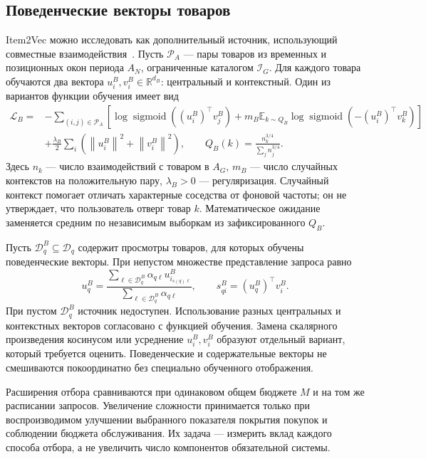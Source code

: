 \documentclass[12pt,a4paper]{article}
\newcommand{\R}{\mathbb R}
\newcommand{\E}{\mathbb E}
\newcommand{\norm}[1]{\left\lVert#1\right\rVert}
\DeclareMathOperator{\sigmoid}{sigmoid}
\theoremstyle{plainru}
\begin{document}
\subsection{Поведенческие векторы товаров}

Item2Vec можно исследовать как дополнительный источник,
использующий совместные взаимодействия~\cite{item2vec}.
Пусть $\mathcal P_A$ --- пары товаров из временных и позиционных
окон периода $A_N$, ограниченные каталогом $\mathcal I_G$. Для каждого товара обучаются
два вектора $u_i^{B},v_i^{B}\in\R^{d_B}$: центральный и контекстный.
Один из вариантов функции обучения имеет вид
\begin{align}\label{eq:model-item2vec}
\mathcal L_B=&-\sum_{(i,j)\in\mathcal P_A}
\left[\log\sigmoid((u_i^{B})^\top v_j^{B})
+m_B\E_{k\sim Q_B}\log\sigmoid(-(u_i^{B})^\top v_k^{B})\right]
\nonumber\\
&+\frac{\lambda_B}{2}\sum_i(\norm{u_i^{B}}^2+\norm{v_i^{B}}^2),
\qquad Q_B(k)=\frac{n_k^{3/4}}{\sum_jn_j^{3/4}}.
\end{align}
Здесь $n_k$ --- число взаимодействий с товаром в $A_G$,
$m_B$ --- число случайных контекстов на положительную пару,
$\lambda_B>0$ --- регуляризация. Случайный контекст помогает
отличать характерные соседства от фоновой частоты;
он не утверждает, что пользователь отверг товар $k$.
Математическое ожидание заменяется средним по независимым
выборкам из зафиксированного $Q_B$.

Пусть $\mathcal D_q^B\subseteq\mathcal D_q$ содержит просмотры товаров,
для которых обучены поведенческие векторы. При непустом множестве
представление запроса равно
\begin{equation}\label{eq:model-item2vec-query}
u_q^B=\frac{\sum_{\ell\in\mathcal D_q^B}
\alpha_{q\ell}u_{i_{s(q)\ell}}^B}
{\sum_{\ell\in\mathcal D_q^B}\alpha_{q\ell}},
\qquad s_{qi}^B=(u_q^B)^\top v_i^B.
\end{equation}
При пустом $\mathcal D_q^B$ источник недоступен.
Использование разных центральных и контекстных векторов
согласовано с функцией обучения. Замена скалярного произведения
косинусом или усреднение $u_i^{B},v_i^{B}$ образуют отдельный вариант,
который требуется оценить. Поведенческие и содержательные векторы
не смешиваются покоординатно без специально обученного отображения.

Расширения отбора сравниваются при одинаковом общем бюджете
$M$ и на том же расписании запросов. Увеличение сложности
принимается только при воспроизводимом улучшении выбранного
показателя покрытия покупок и соблюдении бюджета обслуживания.
Их задача --- измерить вклад каждого способа отбора,
а не увеличить число компонентов обязательной системы.
\end{document}

